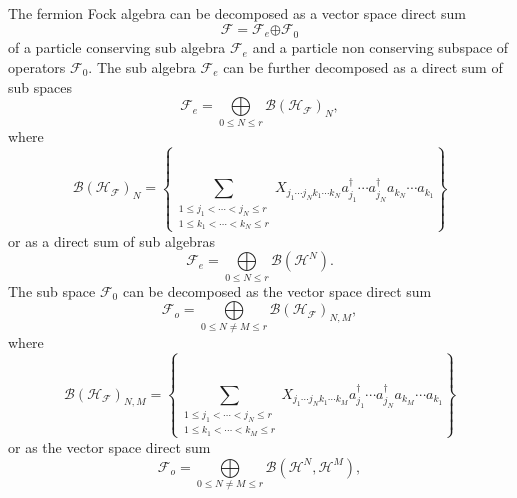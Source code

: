 \documentclass[aps,preprint]{revtex4}%
\begin{document}
The fermion Fock algebra can be decomposed as a vector space direct sum%
\begin{equation}
\mathcal{F=F}_{e}\mathcal{\oplus F}_{0}%
\end{equation}
of a particle conserving sub algebra $\mathcal{F}_{e}$ and a particle non
conserving subspace of operators $\mathcal{F}_{0}$. The sub algebra
$\mathcal{F}_{e}$ can be further decomposed as a direct sum of sub spaces
\begin{equation}
\mathcal{F}_{e}=%
{\displaystyle\bigoplus\limits_{0\leq N\leq r}}
\mathcal{B}\left(  \mathcal{H}_{\mathcal{F}}\right)  _{N}, \label{evenvect}%
\end{equation}
where
\begin{equation}
\mathcal{B}\left(  \mathcal{H}_{\mathcal{F}}\right)  _{N}=\left\{
\sum_{\substack{1\leq j_{1}<\cdots<j_{N}\leq r\\1\leq k_{1}<\cdots<k_{N}\leq
r}}X_{j_{1}\cdots j_{N}k_{1}\cdots k_{N}}a_{j_{1}}^{\dagger}\cdots a_{j_{N}%
}^{\dagger}a_{k_{N}}\cdots a_{k_{1}}\right\}
\end{equation}
or as a direct sum of sub algebras
\begin{equation}
\mathcal{F}_{e}=%
{\displaystyle\bigoplus\limits_{0\leq N\leq r}}
\mathcal{B}\left(  \mathcal{H}^{N}\right)  . \label{evenalg}%
\end{equation}
The sub space $\mathcal{F}_{0}$ can be decomposed as the vector space direct
sum
\begin{equation}
\mathcal{F}_{o}=%
{\displaystyle\bigoplus\limits_{0\leq N\neq M\leq r}}
\mathcal{B}\left(  \mathcal{H}_{\mathcal{F}}\right)  _{N,M}, \label{oddsecond}%
\end{equation}
where
\begin{equation}
\mathcal{B}\left(  \mathcal{H}_{\mathcal{F}}\right)  _{N,M}=\left\{
\sum_{\substack{1\leq j_{1}<\cdots<j_{N}\leq r\\1\leq k_{1}<\cdots<k_{M}\leq
r}}X_{j_{1}\cdots j_{N}k_{1}\cdots k_{M}}a_{j_{1}}^{\dagger}\cdots a_{j_{N}%
}^{\dagger}a_{k_{M}}\cdots a_{k_{1}}\right\}
\end{equation}
or as the vector space direct sum
\begin{equation}
\mathcal{F}_{o}=%
{\displaystyle\bigoplus\limits_{0\leq N\neq M\leq r}}
\mathcal{B}\left(  \mathcal{H}^{N},\mathcal{H}^{M}\right)  , \label{oddfirst}%
\end{equation}
\end{document}
